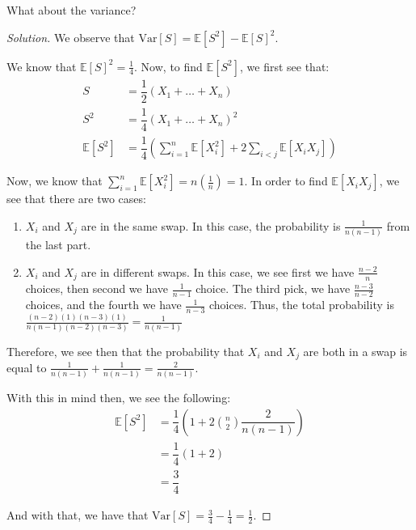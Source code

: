 \documentclass{article}
\newenvironment{solution}{\begin{proof}[Solution]}{\end{proof}}
\let\oldsum\sum
\renewcommand{\sum}[2]{\oldsum\limits_{#1}^{#2}}
\begin{document}
\begin{hw}
	What about the variance?
\end{hw}
\begin{solution}
	We observe that $\mathrm{Var}[S] = \mathbb{E}[S^{2}] - \mathbb{E}[S]^{2}$.
	
	We know that $\mathbb{E}[S]^{2} = \frac{1}{4}$. Now, to find $\mathbb{E}[S^{2}]$, we first see that:
	\begin{align*}
		S &= \dfrac{1}{2}(X_{1} + \ldots + X_{n}) \\
		S^{2} &= \dfrac{1}{4}(X_{1} + \ldots + X_{n})^{2} \\
		\mathbb{E}[S^{2}] &= \dfrac{1}{4}\left( \sum{i=1}{n} \mathbb{E}[X_{i}^{2}] + 2 \sum{i<j}{} \mathbb{E}[X_{i}X_{j}] \right)
	\end{align*}

	Now, we know that $\sum{i=1}{n} \mathbb{E}[X_{i}^{2}] = n\left( \frac{1}{n} \right) = 1$. In order to find $\mathbb{E}[X_{i}X_{j}]$, we see that there are two cases:
	\begin{enumerate}
		\item $X_{i}$ and $X_{j}$ are in the same swap. In this case, the probability is $\frac{1}{n(n-1)}$ from the last part.
		
		\item $X_{i}$ and $X_{j}$ are in different swaps. In this case, we see first we have $\frac{n-2}{n}$ choices, then second we have $\frac{1}{n-1}$ choice. The third pick, we have $\frac{n-3}{n-2}$ choices, and the fourth we have $\frac{1}{n-3}$ choices. Thus, the total probability is $\frac{(n-2)(1)(n-3)(1)}{n(n-1)(n-2)(n-3)} = \frac{1}{n(n-1)}$
	\end{enumerate}

	Therefore, we see then that the probability that $X_{i}$ and $X_{j}$ are both in a swap is equal to $\frac{1}{n(n-1)} + \frac{1}{n(n-1)} = \frac{2}{n(n-1)}$.
	
	With this in mind then, we see the following:
	\begin{align*}
		\mathbb{E}[S^{2}] &= \dfrac{1}{4}\left( 1 + 2\binom{n}{2}\dfrac{2}{n(n-1)} \right) \\
		&= \dfrac{1}{4}\left( 1 + 2 \right) \\
		&= \dfrac{3}{4}
	\end{align*}

	And with that, we have that $\mathrm{Var}[S] = \frac{3}{4} - \frac{1}{4} = \frac{1}{2}$.
\end{solution}
\end{document}
